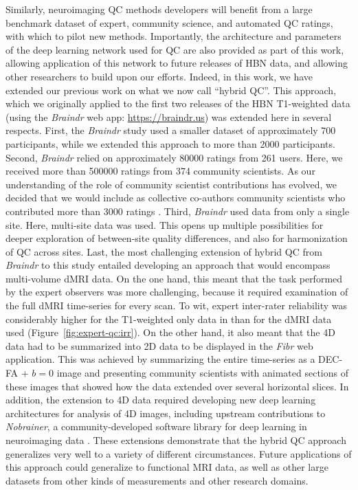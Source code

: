 \documentclass[9pt,lineno]{elife}
\begin{document}
Similarly, neuroimaging QC methods developers will benefit from a large
benchmark dataset of expert, community science, and automated QC ratings, with
which to pilot new methods. Importantly, the architecture and parameters of the
deep learning network used for QC are also provided as part of this work,
allowing application of this network to future releases of HBN data, and
allowing other researchers to build upon our efforts. Indeed, in this work, we
have extended our previous work on what we now call ``hybrid QC''. This
approach, which we originally applied to the first two releases of the HBN
T1-weighted data \citep{keshavan2019-er} (using the \emph{Braindr} web app:
\url{https://braindr.us}) was extended here in several respects.
First, the \emph{Braindr} study used a smaller dataset of approximately 700
participants, while we extended this approach to more than \num{2000} participants.
Second, \emph{Braindr} relied on approximately \num{80000} ratings from
\num{261} users. Here, we received more than \num{500000} ratings from
\num{374} community scientists. As our understanding of the role of
community scientist contributions has evolved, we decided that we would
include as collective co-authors community scientists who contributed more
than \num{3000} ratings \citep{Ward-Fear2020-zq}.
Third, \emph{Braindr} used data from only a single site. Here, multi-site
data was used. This opens up multiple possibilities for deeper exploration of
between-site quality differences, and also for harmonization of QC across
sites.
Last, the most challenging extension of hybrid QC from \emph{Braindr} to
this study entailed developing an approach that would encompass multi-volume
dMRI data. On the one hand, this meant that the task performed by the expert
observers was more challenging, because it required examination of the full
dMRI time-series for every scan. To wit, expert inter-rater reliability was
considerably higher for the T1-weighted only data in \cite{keshavan2019-er}
than for the dMRI data used (Figure~\ref{fig:expert-qc:irr}).
On the other hand, it also meant that the 4D data had to be summarized into
2D data to be displayed in the \emph{Fibr} web application. This was
achieved by summarizing the entire time-series as a DEC-FA + $b=0$ image and
presenting community scientists with animated sections of these images that
showed how the data extended over several horizontal slices.
In addition, the extension to 4D data required developing new deep learning
architectures for analysis of 4D images, including upstream contributions to
\emph{Nobrainer}, a community-developed software library for deep learning
in neuroimaging data \citep{nobrainer}.
These extensions demonstrate that the hybrid QC approach generalizes very well
to a variety of different circumstances. Future applications of this approach
could generalize to functional MRI data, as well as other large datasets from
other kinds of measurements and other research domains.
\end{document}
